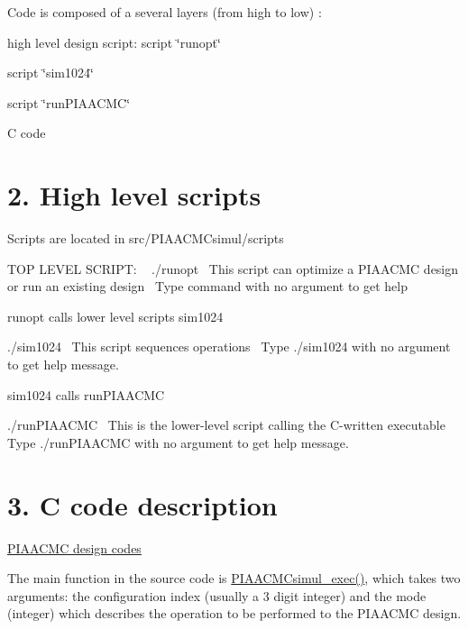 Code is composed of a several layers (from high to low) \+:
\begin{DoxyItemize}
\item high level design script\+: script \char`\"{}runopt\char`\"{}
\item script \char`\"{}sim1024\char`\"{}
\item script \char`\"{}run\+P\+I\+A\+A\+C\+M\+C\char`\"{}
\item C code
\end{DoxyItemize}\hypertarget{md_src_PIAACMCsimul_README_scripts}{}\section{2. High level scripts}\label{md_src_PIAACMCsimul_README_scripts}
Scripts are located in src/\+P\+I\+A\+A\+C\+M\+Csimul/scripts

T\+O\+P L\+E\+V\+E\+L S\+C\+R\+I\+P\+T\+: ~\newline
./runopt~\newline
This script can optimize a P\+I\+A\+A\+C\+M\+C design or run an existing design~\newline
Type command with no argument to get help

runopt calls lower level scripts sim1024

./sim1024~\newline
This script sequences operations~\newline
Type ./sim1024 with no argument to get help message.

sim1024 calls run\+P\+I\+A\+A\+C\+M\+C

./run\+P\+I\+A\+A\+C\+M\+C~\newline
This is the lower-\/level script calling the C-\/written executable~\newline
Type ./run\+P\+I\+A\+A\+C\+M\+C with no argument to get help message.\hypertarget{md_src_PIAACMCsimul_README_code}{}\section{3. C code description}\label{md_src_PIAACMCsimul_README_code}
\hyperlink{PIAACMC_designcodes}{P\+I\+A\+A\+C\+M\+C design codes}

The main function in the source code is \hyperlink{PIAACMCsimul_8c_a1083c078214e43d74447950f8a236c5d}{P\+I\+A\+A\+C\+M\+Csimul\+\_\+exec()}, which takes two arguments\+: the configuration index (usually a 3 digit integer) and the mode (integer) which describes the operation to be performed to the P\+I\+A\+A\+C\+M\+C design.

